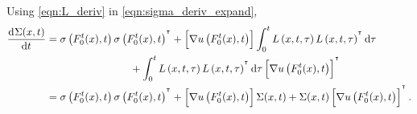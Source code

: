 Using \eqref{eqn:L_deriv} in \eqref{eqn:sigma_deriv_expand},
\begin{align*}
	\dod{\Sigma(x,t)}{t} & = \sigma\left(F_0^t(x), t\right)\sigma\left(F_0^t(x), t\right)^{\T} + \left[\nabla u\left(F_0^t(x), t\right)\right]\int_0^t{L\left(x,t,\tau\right)L\left(x,t,\tau\right)^{\T}\dif\tau}          \\
	                     & \qquad\qquad\qquad\qquad + \int_0^t{L\left(x,t,\tau\right)L\left(x,t,\tau\right)^{\T}\dif\tau}\left[\nabla u\left(F_0^t(x), t\right)\right]^{\T}                                                \\
	                     & = \sigma\left(F_0^t(x), t\right)\sigma\left(F_0^t(x), t\right)^{\T} + \left[\nabla u\left(F_0^t(x), t\right)\right]\Sigma(x,t) + \Sigma(x,t)\left[\nabla u\left(F_0^t(x), t\right)\right]^{\T}.
\end{align*}




